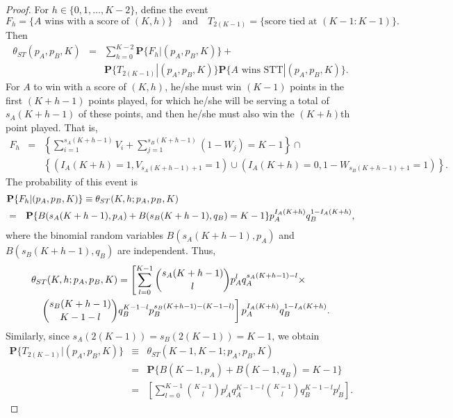 \documentclass[11pt]{article}
\theoremstyle{plain}
\theoremstyle{definition}
\renewcommand{\Pr}{\mathbf{P}}
\newcommand{\BLUE}[1]{{\color{blue} #1}}
\begin{document}
\begin{proof}



For $h \in \{0,1,\ldots,K-2\}$, define the event
%
$$F_h = \{\mbox{$A$ wins with a score of $(K,h)$}\} \quad \mbox{and} \quad 
T_{2(K-1)} = \{\mbox{score tied at $(K-1:K-1)$\}.}$$
%
Then
%
\begin{eqnarray*}
\theta_{ST}(p_A,p_B,K) & = & \sum_{h=0}^{K-2} \Pr\{F_h|(p_A,p_B,K)\} + \\ && 
\Pr\{T_{2(K-1)}|(p_A,p_B,K)\} \Pr\{\mbox{$A$ wins STT}|(p_A,p_B,K)\}.
\end{eqnarray*}
%
For $A$ to win with a score of $(K,h)$, he/she must win $(K-1)$ points in the first $(K+h-1)$ points played, for which he/she will be serving a total of $s_A(K+h-1)$ of these points, and then he/she must also win the $(K+h)$th point played. That is,
%
\begin{eqnarray*}
F_h & = & \left\{\sum_{i=1}^{s_A(K+h-1)} V_i + \sum_{j=1}^{s_B(K+h-1)} (1 - W_j) = K-1\right\} \cap \\ &&
\left\{(I_A(K+h) = 1, V_{s_A(K+h-1)+1} = 1) \cup 
(I_A(K+h) = 0, 1-W_{s_B(K+h-1)+1} = 1)\right\}.
\end{eqnarray*}
%
The probability of this event is
%
\begin{eqnarray*} 
\lefteqn{\Pr\{F_h|(p_A,p_B,K)\}  \equiv \theta_{ST}(K,h;p_A,p_B,K) } \\
& = & \Pr\{B(s_A(K+h-1),p_A) + B(s_B(K+h-1),q_B) = K-1\} p_A^{I_A(K+h)} q_B^{1-I_A(K+h)},
\end{eqnarray*}
%
where the binomial random variables $B(s_A(K+h-1),p_A)$ and $B(s_B(K+h-1),q_B)$ are independent. Thus,
%
\begin{eqnarray*}
\lefteqn{ \theta_{ST}(K,h;p_A,p_B,K)  =   
\left[\sum_{l=0}^{K-1}
{{s_A(K+h-1)} \choose l} p_A^l q_A^{{s_A(K+h-1)}-l} \times \right. } \\ && \left. {{s_B(K+h-1)} \choose {K-1-l}} q_B^{K-1-l} p_B^{s_B(K+h-1)-(K-1-l)}\right]  p_A^{I_A(K+h)} q_B^{1-I_A(K+h)}.
\end{eqnarray*}
%
Similarly, since $s_A(2(K-1)) = s_B(2(K-1)) = K-1$, we obtain
%
\begin{eqnarray*}
   \Pr\{T_{2(K-1)}|(p_A,p_B,K)\} & \equiv & \theta_{ST}(K-1,K-1;p_A,p_B,K) \\  & = & \Pr\{B(K-1,p_A) + B(K-1,q_B) = K-1\}  \\
    & = & \left[\sum_{l=0}^{K-1}
{{K-1} \choose l} p_A^l q_A^{{K-1}-l} {{K-1} \choose {l}} q_B^{K-1-l} p_B^{l}\right].
\end{eqnarray*}


\end{proof}
\end{document}
